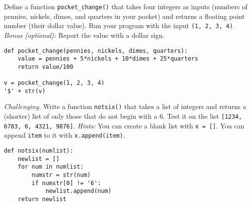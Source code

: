 \documentclass[11pt]{exam}
\begin{document}
\begin{questions}


\item Define a function \verb|pocket_change()| that takes four integers as inputs
(numbers of pennies, nickels, dimes, and quarters in your pocket)
and returns a floating point number (their dollar value).
Run your program with the input {\tt (1, 2, 3, 4)}.
{\it Bonus (optional):} Report the value with a dollar sign.

\begin{solution}
\begin{verbatim}
def pocket_change(pennies, nickels, dimes, quarters):
    value = pennies + 5*nickels + 10*dimes + 25*quarters
    return value/100

v = pocket_change(1, 2, 3, 4)
'$' + str(v)
\end{verbatim}
\end{solution}


\item {\it Challenging.\/}
Write a function {\tt notsix()} that takes a list of integers
and returns a (shorter) list of only those that do not begin with a 6.
Test it on the list {\tt [1234, 6783, 6, 4321, 9876]}.
{\it Hints:}  You can create a blank list with {\tt x = []}.
You can append  {\tt item} to it with {\tt x.append(item)}.

\begin{solution}
\begin{verbatim}
def notsix(numlist):
    newlist = []
    for num in numlist:
        numstr = str(num)
        if numstr[0] != '6':
            newlist.append(num)
    return newlist


\end{verbatim}
\end{solution}
\end{questions}
\end{document}
